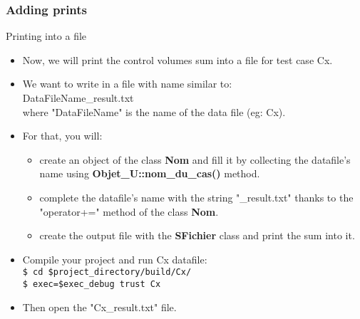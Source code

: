 \documentclass[10pt, hyperref={unicode=true,pdfusetitle, bookmarks=true,bookmarksnumbered=false,bookmarksopen=false, breaklinks=false,pdfborder={0 0 1},backref=true,colorlinks=true,linkcolor=darkblue,pageanchor, urlcolor=darkblue}]{beamer}
\begin{document}
\begin{frame}
\frametitle{Adding prints}
\begin{block}{Printing into a file}

\begin{itemize}

\item Now, we will print the control volumes sum into a file for test case Cx. 

\item We want to write in a file with name similar to: \\
DataFileName\_result.txt \\
where "DataFileName" is the name of the data file (eg: Cx).

\item For that, you will:
\begin{itemize}
\item  create an object of the class \textbf{Nom} and fill it by collecting the datafile's name using \textbf{Objet\_U::nom\_du\_cas()} method.
\item complete the datafile's name with the string "\_result.txt" thanks to the "operator+=" method of the class \textbf{Nom}.
\item create the output file with the \textbf{SFichier} class and print the sum into it.
\end{itemize}
\item Compile your project and run Cx datafile: \\
\texttt{\$ cd \$project\_directory/build/Cx/}\\
\texttt{\$ exec=\$exec\_debug trust Cx}
\item Then open the "Cx\_result.txt" file.
\end{itemize}

\end{block}
\end{frame}

\end{document}

